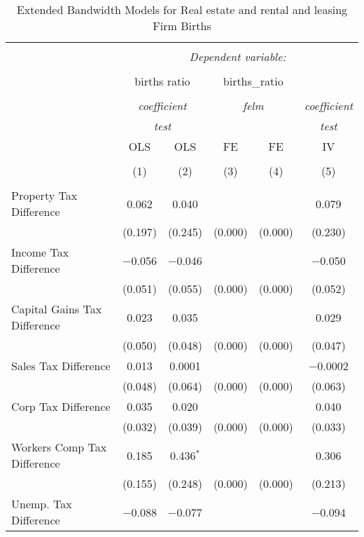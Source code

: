 
\begin{table}[!htbp] \centering 
  \caption{Extended Bandwidth Models for  Real estate and rental and leasing Firm Births} 
  \label{} 
\begin{tabular}{@{\extracolsep{5pt}}lccccc} 
\\[-1.8ex]\hline 
\hline \\[-1.8ex] 
 & \multicolumn{5}{c}{\textit{Dependent variable:}} \\ 
\cline{2-6} 
\\[-1.8ex] & \multicolumn{2}{c}{births ratio} & \multicolumn{2}{c}{births\_ratio} &   \\ 
\\[-1.8ex] & \multicolumn{2}{c}{\textit{coefficient}} & \multicolumn{2}{c}{\textit{felm}} & \textit{coefficient} \\ 
 & \multicolumn{2}{c}{\textit{test}} & \multicolumn{2}{c}{\textit{}} & \textit{test} \\ 
 & OLS & OLS & FE & FE & IV \\ 
\\[-1.8ex] & (1) & (2) & (3) & (4) & (5)\\ 
\hline \\[-1.8ex] 
 Property Tax Difference & 0.062 & 0.040 &  &  & 0.079 \\ 
  & (0.197) & (0.245) & (0.000) & (0.000) & (0.230) \\ 
  Income Tax Difference & $-$0.056 & $-$0.046 &  &  & $-$0.050 \\ 
  & (0.051) & (0.055) & (0.000) & (0.000) & (0.052) \\ 
  Capital Gains Tax Difference & 0.023 & 0.035 &  &  & 0.029 \\ 
  & (0.050) & (0.048) & (0.000) & (0.000) & (0.047) \\ 
  Sales Tax Difference & 0.013 & 0.0001 &  &  & $-$0.0002 \\ 
  & (0.048) & (0.064) & (0.000) & (0.000) & (0.063) \\ 
  Corp Tax Difference & 0.035 & 0.020 &  &  & 0.040 \\ 
  & (0.032) & (0.039) & (0.000) & (0.000) & (0.033) \\ 
  Workers Comp Tax Difference & 0.185 & 0.436$^{*}$ &  &  & 0.306 \\ 
  & (0.155) & (0.248) & (0.000) & (0.000) & (0.213) \\ 
  Unemp. Tax Difference & $-$0.088 & $-$0.077 &  &  & $-$0.094 \\ 

\end{tabular}
\end{table}
